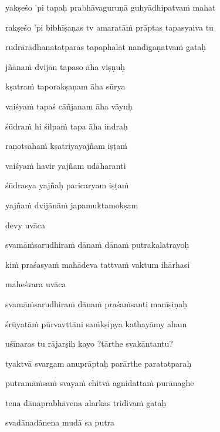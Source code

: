 \nemslokab 
yakṣeśo 'pi tapaḥ prabhāvaguruṇā guhyādhipatva\.m mahat \danda\dontdisplaylinenum

\nemslokac 
rakṣeśo 'pi bibhīṣaṇas tv amaratā\.m prāptas tapasyaiva tu
\dontdisplaylinenum

\nemslokad 
rudrārādhanatatparās tapaphalāt nandīgaṇatva\.m gataḥ \veg\dontdisplaylinenum

\ujvers\nemsloka 
jñāna\.m dvijān tapaso āha viṣṇuḥ
\dontdisplaylinenum

\nemslokab 
kṣatra\.m taporakṣaṇam āha sūrya \danda\dontdisplaylinenum

\nemslokac 
vaiśya\.m tapaś cāñjanam āha vāyuḥ
\dontdisplaylinenum

\nemslokad 
śūdra\.m hi śilpa\.m tapa āha indraḥ \veg\dontdisplaylinenum

\ujvers\nemsloka 
raṇotsaha\.m kṣatriyayajñam iṣṭa\.m
\dontdisplaylinenum

\nemslokab 
vaiśya\.m havir yajñam udāharanti \danda\dontdisplaylinenum

\nemslokac 
śūdrasya yajñaḥ paricaryam iṣṭa\.m
\dontdisplaylinenum

\nemslokad 
yajña\.m dvijānā\.m japamuktamokṣam \veg\dontdisplaylinenum

\vers

devy uvāca~{\dandab}\dontdisplaylinenum 

svamā\.msarudhira\.m dāna\.m dāna\.m putrakalatrayoḥ\thinspace{\danda} \dontdisplaylinenum

ki\.m praśasya\.m mahādeva tattva\.m vaktum ihārhasi \veg\dontdisplaylinenum

maheśvara uvāca~{\dandab}\dontdisplaylinenum 

svamā\.msarudhira\.m dāna\.m praśa\.msanti manīṣiṇaḥ\thinspace{\danda} \dontdisplaylinenum

śrūyatā\.m pūrvavttāni sa\.mkṣipya kathayāmy aham \veg\dontdisplaylinenum

uśīnaras tu rājarṣiḥ kayo ?tārthe svakāntantu? \thinspace{\dandab} \dontdisplaylinenum

tyaktvā svargam anuprāptaḥ parārthe paratatparaḥ \veg\dontdisplaylinenum

putramā\.msa\.m svaya\.m chitvā agnidatta\.m purānaghe\thinspace{\dandab} \dontdisplaylinenum

tena dānaprabhāvena alarkas tridiva\.m gataḥ \veg\dontdisplaylinenum

\ujvers\nemsloka 
svadānadānena mudā sa putra
\dontdisplaylinenum

